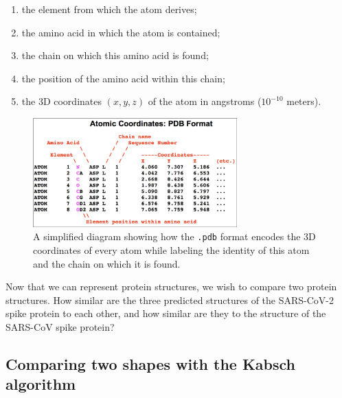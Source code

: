 \begin{enumerate}
	\item the element from which the atom derives;
	\item the amino acid in which the atom is contained;
	\item the chain on which this amino acid is found;
	\item the position of the amino acid within this chain;
	\item the 3D coordinates $(x, y, z)$ of the atom in angstroms ($10^{-10}$ meters).
\end{enumerate}

\begin{figure}[h]
	\centering
	\mySfFamily
	\includegraphics[width = 0.7\textwidth]{../images/simplifiedPDB.png}
	\caption{A simplified diagram showing how the \texttt{.pdb} format encodes the 3D coordinates of every atom while labeling the identity of this atom and the chain on which it is found.}
	\label{fig:simplifiedPDB}
\end{figure}

\begin{note}\end{note}

Now that we can represent protein structures, we wish to compare two protein structures. How similar are the three predicted structures of the SARS-CoV-2 spike protein to each other, and how similar are they to the structure of the SARS-CoV spike protein? \\



\FloatBarrier
{}
\subsection{Comparing two shapes with the Kabsch algorithm}

